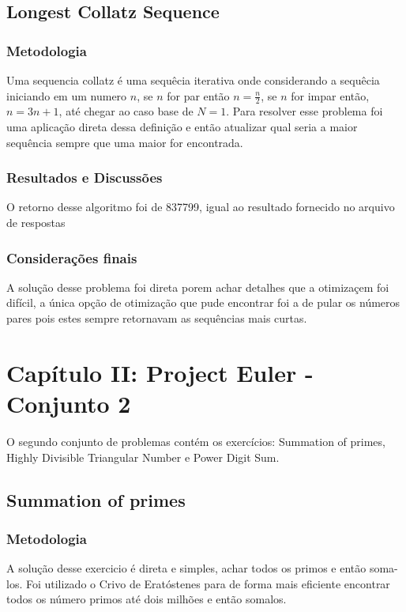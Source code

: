 \documentclass{article}
\begin{document}
    \subsection{Longest Collatz Sequence}
        
        \subsubsection{Metodologia}
        Uma sequencia collatz é uma sequêcia iterativa onde considerando a sequêcia iniciando em um numero $n$, se $n$ for par então $n = \frac{n}{2}$, se $n$ for impar então, $n = 3n + 1$, até chegar ao caso base de $N = 1$. Para resolver esse problema foi uma aplicação direta dessa definição e então atualizar qual seria a maior sequência sempre que uma maior for encontrada.
        
        \subsubsection{Resultados e Discussões}
        O retorno desse algoritmo foi de 837799, igual ao resultado fornecido no arquivo de respostas
        
        \subsubsection{Considerações finais}
        A solução desse problema foi direta porem achar detalhes que a otimizaçem foi difícil, a única opção de otimização que pude encontrar foi a de pular os números pares pois estes sempre retornavam as sequências mais curtas.
\clearpage

\section{Capítulo II: Project Euler - Conjunto 2}
O segundo conjunto de problemas contém os exercícios: Summation of primes, Highly Divisible Triangular Number e Power Digit Sum.
    \subsection{Summation of primes}
        
        \subsubsection{Metodologia} 
        A solução desse exercicio é direta e simples, achar todos os primos e então soma-los. Foi utilizado o Crivo de Eratóstenes para de forma mais eficiente encontrar todos os número primos até dois milhões e então somalos.
        
\end{document}
